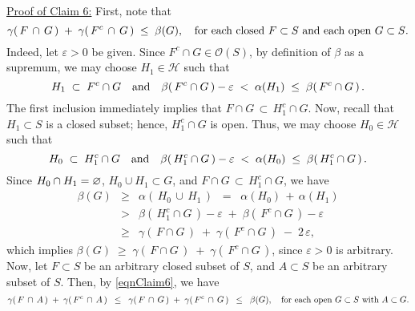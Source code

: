 \vskip 0.5cm
\noindent
\underline{Proof of Claim 6:}\quad
First, note that
\begin{equation}
\label{eqnClaim6}
\gamma(\,F\,\cap\,G\,) \;+\; \gamma(\,F^{c}\,\cap\,G\,) \;\leq\; \beta(G),
\quad
\textnormal{for each closed $F \subset S$ and each open $G \subset S$}.
\end{equation}
Indeed, let $\varepsilon > 0$ be given.
Since $F^{c}\cap G \in \mathcal{O}(S)$, by definition of $\beta$ as a supremum,
we may choose $H_{1} \in \mathcal{H}$ such that
\begin{equation*}
H_{1}\;\subset\;F^{c}\cap G
\quad\textnormal{and}\quad
\beta\!\left(\,F^{c}\cap G\,\right) - \varepsilon \;<\; \alpha(H_{1}) \;\leq\; \beta\!\left(\,F^{c}\cap G\,\right).
\end{equation*}
The first inclusion immediately implies that $F\cap G \,\subset\, H_{1}^{c}\cap G$.
Now, recall that $H_{1} \subset S$ is a closed subset; hence, $H_{1}^{c}\cap G$ is open.
Thus, we may choose $H_{0} \in \mathcal{H}$ such that
\begin{equation*}
H_{0}\;\subset\;H_{1}^{c}\cap G
\quad\textnormal{and}\quad
\beta\!\left(\,H_{1}^{c}\cap G\,\right) - \varepsilon \;<\; \alpha(H_{0}) \;\leq\; \beta\!\left(\,H_{1}^{c}\cap G\,\right).
\end{equation*}
Since $H_{0}\cap H_{1} = \varnothing$, $H_{0} \cup H_{1} \subset G$, and
$F\cap G \,\subset\, H_{1}^{c}\cap G$, we have
\begin{eqnarray*}
\beta(G)
&\geq& \alpha\!\left(\,H_{0}\,\cup\,H_{1}\,\right)
\;\;=\;\; \alpha(H_{0})\,+\,\alpha(H_{1})
\\
& > & \beta\!\left(\,H_{1}^{c}\cap G\,\right) - \varepsilon \;+\; \beta\!\left(\,F^{c}\cap G\,\right) - \varepsilon
\\
&\geq& \gamma\!\left(\,F\cap G\,\right) \;+\; \gamma\!\left(\,F^{c}\cap G\,\right) \;-\; 2\,\varepsilon,
\end{eqnarray*}
which implies $\beta(G) \;\geq\; \gamma\!\left(\,F\cap G\,\right) \;+\; \gamma\!\left(\,F^{c}\cap G\,\right)$,
since $\varepsilon > 0$ is arbitrary.
\vskip 0.3cm
\noindent
Now, let $F \subset S$ be an arbitrary closed subset of $S$, and $A \subset S$ be an arbitrary subset of $S$.
Then, by \eqref{eqnClaim6}, we have
\begin{equation*}
\gamma(\,F\,\cap\,A\,) \;+\; \gamma(\,F^{c}\,\cap\,A\,)
\;\;\leq\;\; \gamma(\,F\,\cap\,G\,) \;+\; \gamma(\,F^{c}\,\cap\,G\,)
\;\;\leq\;\; \beta(G),
\quad
\textnormal{for each open $G \subset S$ with $A \subset G$}.
\end{equation*}
